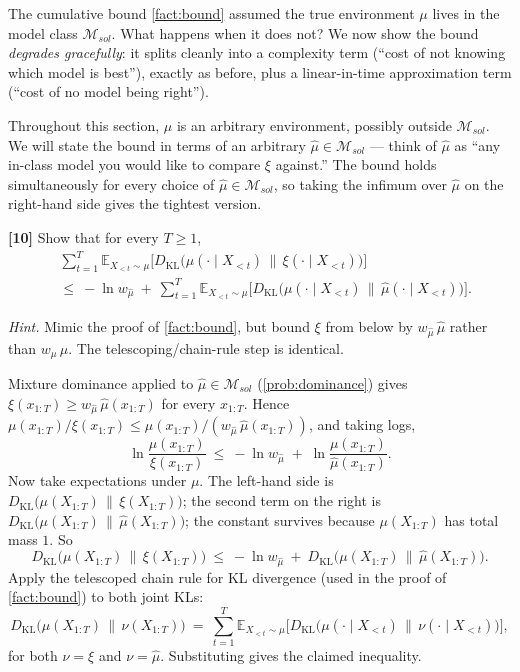 \documentclass[fontsize=11pt, parskip=half]{scrartcl}
\theoremstyle{definition}
\newenvironment{solution}{%
    \begin{tcolorbox}[colback=black!5!white, colframe=black!50!white,
      title={\textbf{Solution}}, fonttitle=\normalfont, breakable]
  }{\end{tcolorbox}}
\newenvironment{solution}{\expandafter\comment}{\expandafter\endcomment}
\newcommand{\Msol}{\mathcal{M}_{sol}}
\begin{document}
The cumulative bound \cref{fact:bound} assumed the true environment $\mu$ lives
in the model class $\Msol$. What happens when it does not? We now show the
bound \emph{degrades gracefully}: it splits cleanly into a complexity term
(``cost of not knowing which model is best''), exactly as before, plus a
linear-in-time approximation term (``cost of no model being right'').

Throughout this section, $\mu$ is an arbitrary environment, possibly outside
$\Msol$. We will state the bound in terms of an arbitrary
$\hat\mu \in \Msol$ --- think of $\hat\mu$ as ``any in-class model you would
like to compare $\xi$ against.'' The bound holds simultaneously for every
choice of $\hat\mu \in \Msol$, so taking the infimum over $\hat\mu$ on the
right-hand side gives the tightest version.

\bigskip

\noindent
\textbf{[10]} Show that for every $T \geq 1$,
\begin{align*}
  &\sum_{t=1}^{T} \mathbb{E}_{X_{<t} \sim \mu}\!\Big[
    D_{\text{KL}}\!\big(\mu(\cdot \mid X_{<t}) \,\|\, \xi(\cdot \mid X_{<t})\big)
  \Big] \\
  &\leq~
  -\ln w_{\hat\mu}
  ~+~
  \sum_{t=1}^{T} \mathbb{E}_{X_{<t} \sim \mu}\!\Big[
    D_{\text{KL}}\!\big(\mu(\cdot \mid X_{<t}) \,\|\, \hat\mu(\cdot \mid X_{<t})\big)
  \Big].
\end{align*}

\textit{Hint.} Mimic the proof of \cref{fact:bound}, but bound $\xi$ from below
by $w_{\hat\mu} \,\hat\mu$ rather than $w_\mu \, \mu$. The telescoping/chain-rule
step is identical.

\begin{solution}
Mixture dominance applied to $\hat\mu \in \Msol$ (\cref{prob:dominance}) gives
$\xi(x_{1:T}) \geq w_{\hat\mu}\, \hat\mu(x_{1:T})$ for every $x_{1:T}$. Hence
$\mu(x_{1:T})/\xi(x_{1:T}) \leq \mu(x_{1:T}) / (w_{\hat\mu}\, \hat\mu(x_{1:T}))$,
and taking logs,
\[
  \ln \frac{\mu(x_{1:T})}{\xi(x_{1:T})}
  ~\leq~ -\ln w_{\hat\mu} \;+\; \ln \frac{\mu(x_{1:T})}{\hat\mu(x_{1:T})}.
\]
Now take expectations under $\mu$. The left-hand side is
$D_{\text{KL}}\big(\mu(X_{1:T}) \,\|\, \xi(X_{1:T})\big)$; the second term on
the right is $D_{\text{KL}}\big(\mu(X_{1:T}) \,\|\, \hat\mu(X_{1:T})\big)$;
the constant survives because $\mu(X_{1:T})$ has total mass $1$. So
\[
  D_{\text{KL}}\!\big(\mu(X_{1:T}) \,\|\, \xi(X_{1:T})\big)
  ~\leq~
  -\ln w_{\hat\mu}
  ~+~
  D_{\text{KL}}\!\big(\mu(X_{1:T}) \,\|\, \hat\mu(X_{1:T})\big).
\]
Apply the telescoped chain rule for KL divergence (used in the proof of
\cref{fact:bound}) to both joint KLs:
\[
  D_{\text{KL}}\!\big(\mu(X_{1:T}) \,\|\, \nu(X_{1:T})\big)
  ~=~ \sum_{t=1}^{T} \mathbb{E}_{X_{<t} \sim \mu}\!\Big[
    D_{\text{KL}}\!\big(\mu(\cdot \mid X_{<t}) \,\|\, \nu(\cdot \mid X_{<t})\big)
  \Big],
\]
for both $\nu = \xi$ and $\nu = \hat\mu$. Substituting gives the claimed
inequality. \qedhere
\end{solution}
\end{document}
